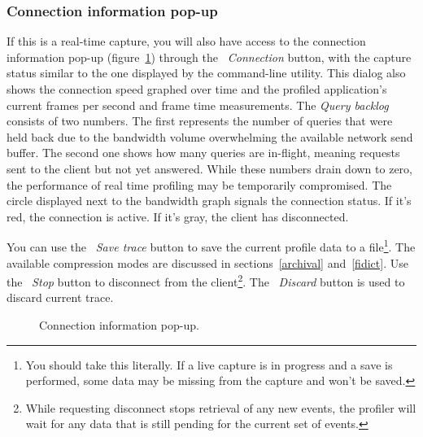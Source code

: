 \documentclass[hidelinks,titlepage,a4paper,twoside]{article}
\begin{document}
\subsubsection{Connection information pop-up}
\label{connectionpopup}

If this is a real-time capture, you will also have access to the connection information pop-up (figure~\ref{connectioninfo}) through the \emph{\faWifi{}~Connection} button, with the capture status similar to the one displayed by the command-line utility. This dialog also shows the connection speed graphed over time and the profiled application's current frames per second and frame time measurements. The \emph{Query backlog} consists of two numbers. The first represents the number of queries that were held back due to the bandwidth volume overwhelming the available network send buffer. The second one shows how many queries are in-flight, meaning requests sent to the client but not yet answered. While these numbers drain down to zero, the performance of real time profiling may be temporarily compromised. The circle displayed next to the bandwidth graph signals the connection status. If it's red, the connection is active. If it's gray, the client has disconnected.

You can use the \faSave{}~\emph{Save trace} button to save the current profile data to a file\footnote{You should take this literally. If a live capture is in progress and a save is performed, some data may be missing from the capture and won't be saved.}. The available compression modes are discussed in sections~\ref{archival} and~\ref{fidict}. Use the \faPlug{}~\emph{Stop} button to disconnect from the client\footnote{While requesting disconnect stops retrieval of any new events, the profiler will wait for any data that is still pending for the current set of events.}. The \faExclamationTriangle{}~\emph{Discard} button is used to discard current trace.

\begin{figure}[h]
\centering{}
\caption{Connection information pop-up.}
\label{connectioninfo}
\end{figure}
\end{document}
